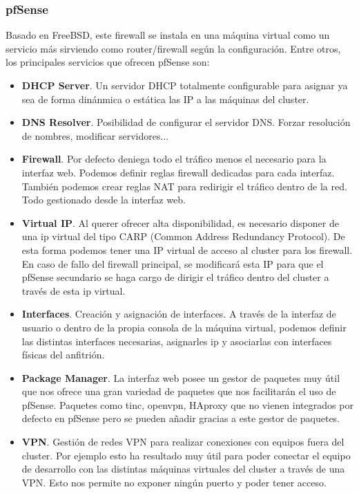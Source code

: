 		\subsubsection{pfSense}
			\begin{text}
				Basado en FreeBSD, este firewall se instala en una máquina virtual como un servicio más sirviendo como router/firewall según la configuración. Entre otros, los principales servicios que ofrecen pfSense son:
				\begin{itemize}
					\item \textbf{DHCP Server}. Un servidor DHCP totalmente configurable para asignar ya sea de forma dinánmica o estática las IP a las máquinas del cluster.
					\item \textbf{DNS Resolver}. Posibilidad de configurar el servidor DNS. Forzar resolución de nombres, modificar servidores...
					\item \textbf{Firewall}. Por defecto deniega todo el tráfico menos el necesario para la interfaz web. Podemos definir reglas firewall dedicadas para cada interfaz. También podemos crear reglas NAT para redirigir el tráfico dentro de la red. Todo gestionado desde la interfaz web.
					\item \textbf{Virtual IP}. Al querer ofrecer alta disponibilidad, es necesario disponer de una ip virtual del tipo CARP (Common Address Redundancy Protocol). De esta forma podemos tener una IP virtual de acceso al cluster para los firewall. En caso de fallo del firewall principal, se modificará esta IP para que el pfSense secundario se haga cargo de dirigir el tráfico dentro del cluster a través de esta ip virtual.
					\item \textbf{Interfaces}. Creación y asignación de interfaces. A través de la interfaz de usuario o dentro de la propia consola de la máquina virtual, podemos definir las distintas interfaces necesarias, asignarles ip y asociarlas con interfaces físicas del anfitrión.
					\item \textbf{Package Manager}. La interfaz web posee un gestor de paquetes muy útil que nos ofrece una gran variedad de paquetes que nos facilitarán el uso de pfSense. Paquetes como tinc, openvpn, HAproxy que no vienen integrados por defecto en pfSense pero se pueden añadir gracias a este gestor de paquetes.
					\item \textbf{VPN}. Gestión de redes VPN para realizar conexiones con equipos fuera del cluster. Por ejemplo esto ha resultado muy útil para poder conectar el equipo de desarrollo con las distintas máquinas virtuales del cluster a través de una VPN. Esto nos permite no exponer ningún puerto y poder tener acceso.

\end{itemize}
\end{text}
